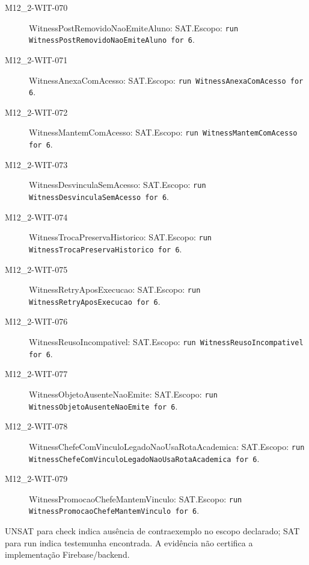 \begin{description}
\item[M12\_2-WIT-070] WitnessPostRemovidoNaoEmiteAluno: SAT.\newline Escopo: \texttt{run WitnessPostRemovidoNaoEmiteAluno for 6}.
\item[M12\_2-WIT-071] WitnessAnexaComAcesso: SAT.\newline Escopo: \texttt{run WitnessAnexaComAcesso for 6}.
\item[M12\_2-WIT-072] WitnessMantemComAcesso: SAT.\newline Escopo: \texttt{run WitnessMantemComAcesso for 6}.
\item[M12\_2-WIT-073] WitnessDesvinculaSemAcesso: SAT.\newline Escopo: \texttt{run WitnessDesvinculaSemAcesso for 6}.
\item[M12\_2-WIT-074] WitnessTrocaPreservaHistorico: SAT.\newline Escopo: \texttt{run WitnessTrocaPreservaHistorico for 6}.
\item[M12\_2-WIT-075] WitnessRetryAposExecucao: SAT.\newline Escopo: \texttt{run WitnessRetryAposExecucao for 6}.
\item[M12\_2-WIT-076] WitnessReusoIncompativel: SAT.\newline Escopo: \texttt{run WitnessReusoIncompativel for 6}.
\item[M12\_2-WIT-077] WitnessObjetoAusenteNaoEmite: SAT.\newline Escopo: \texttt{run WitnessObjetoAusenteNaoEmite for 6}.
\item[M12\_2-WIT-078] WitnessChefeComVinculoLegadoNaoUsaRotaAcademica: SAT.\newline Escopo: \texttt{run WitnessChefeComVinculoLegadoNaoUsaRotaAcademica for 6}.
\item[M12\_2-WIT-079] WitnessPromocaoChefeMantemVinculo: SAT.\newline Escopo: \texttt{run WitnessPromocaoChefeMantemVinculo for 6}.
\end{description}
UNSAT para check indica ausência de contraexemplo no escopo declarado; SAT para run indica testemunha encontrada. A evidência não certifica a implementação Firebase/backend.
